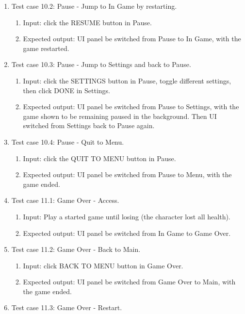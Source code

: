 \documentclass[11pt]{article}
\begin{document}
\begin{enumerate}
        \item Test case 10.2: Pause - Jump to In Game by restarting.
        \begin{enumerate}
            \item  Input: click the RESUME button in Pause.
            \item  Expected output: UI panel be switched from Pause to In Game, with the game restarted.
        \end{enumerate}
        \item Test case 10.3: Pause - Jump to Settings and back to Pause.
        \begin{enumerate}
            \item  Input: click the SETTINGS button in Pause, toggle different settings, then click DONE in Settings.
            \item  Expected output: UI panel be switched from Pause to Settings, with the game shown to be remaining paused in the background. Then UI switched from Settings back to Pause again.
        \end{enumerate}
        \item Test case 10.4: Pause - Quit to Menu.
        \begin{enumerate}
            \item  Input: click the QUIT TO MENU button in Pause.
            \item  Expected output: UI panel be switched from Pause to Menu, with the game ended.
        \end{enumerate}
        \item Test case 11.1: Game Over - Access.
        \begin{enumerate}
            \item  Input: Play a started game until losing (the character lost all health).
            \item  Expected output: UI panel be switched from In Game to Game Over.
        \end{enumerate}
        \item Test case 11.2: Game Over - Back to Main.
        \begin{enumerate}
            \item  Input: click BACK TO MENU button in Game Over.
            \item  Expected output: UI panel be switched from Game Over to Main, with the game ended.
        \end{enumerate}
        \item Test case 11.3: Game Over - Restart.

\end{enumerate}
\end{document}
